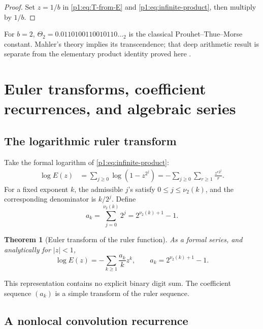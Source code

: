 \documentclass[11pt,oneside]{article}
\numberwithin{equation}{section}
\newtheorem{theorem}{Theorem}[section]
\theoremstyle{definition}
\theoremstyle{remark}
\newcommand{\vtwo}{\nu_2}
\begin{document}
\begin{proof}
Set \(z=1/b\) in \eqref{p1:eq:T-from-E} and
\eqref{p1:eq:infinite-product}, then multiply by \(1/b\).
\end{proof}

For \(b=2\), \(\Theta_2=0.0110100110010110\ldots{}_2\) is the classical
Prouhet--Thue--Morse constant.  Mahler's theory implies its transcendence; that
deep arithmetic result is separate from the elementary product identity
proved here \cite{p1:mahler1929,p1:alloucheShallit2003}.

\section[Euler transforms and algebraic series]{Euler transforms, coefficient recurrences, and algebraic series}
\label{p1:sec:euler}

\subsection{The logarithmic ruler transform}

Take the formal logarithm of \eqref{p1:eq:infinite-product}:
\begin{align}
 \log E(z)
 &=\sum_{j\ge0}\log(1-z^{2^j})
  =-\sum_{j\ge0}\sum_{r\ge1}\frac{z^{r2^j}}r.
  \label{p1:eq:log-E-double}
\end{align}
For a fixed exponent \(k\), the admissible \(j\)'s satisfy
\(0\le j\le\vtwo(k)\), and the corresponding denominator is \(k/2^j\).
Define
\begin{equation}
  a_k=\sum_{j=0}^{\vtwo(k)}2^j
      =2^{\vtwo(k)+1}-1.
  \label{p1:eq:ak-definition}
\end{equation}

\begin{theorem}[Euler transform of the ruler function]
\label{p1:thm:log-E}
As a formal series, and analytically for \(|z|<1\),
\begin{equation}
  \boxed{
  \log E(z)=-\sum_{k\ge1}\frac{a_k}{k}z^k,
  \qquad a_k=2^{\vtwo(k)+1}-1.}
  \label{p1:eq:log-E}
\end{equation}
\end{theorem}

This representation contains no explicit binary digit sum.  The coefficient
sequence \((a_k)\) is a simple transform of the ruler sequence.

\subsection{A nonlocal convolution recurrence}
\end{document}
